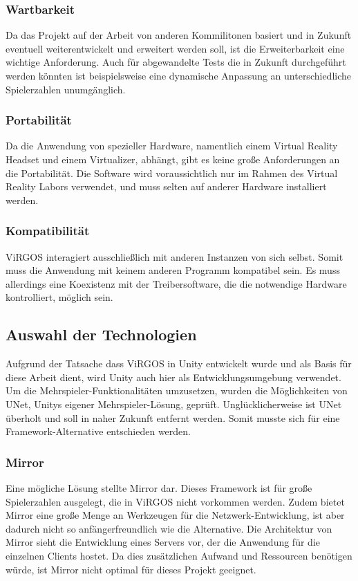 \subsubsection*{Wartbarkeit}
Da das Projekt auf der Arbeit von anderen Kommilitonen basiert und in Zukunft eventuell weiterentwickelt und erweitert werden soll, ist die Erweiterbarkeit eine wichtige Anforderung. Auch für abgewandelte Tests die in Zukunft durchgeführt werden könnten ist beispielsweise eine dynamische Anpassung an unterschiedliche Spielerzahlen unumgänglich.

\subsubsection*{Portabilität}
Da die Anwendung von spezieller Hardware, namentlich einem Virtual Reality Headset und einem Virtualizer, abhängt, gibt es keine große Anforderungen an die Portabilität. Die Software wird voraussichtlich nur im Rahmen des Virtual Reality Labors verwendet, und muss selten auf anderer Hardware installiert werden.

\subsubsection*{Kompatibilität}
ViRGOS interagiert ausschließlich mit anderen Instanzen von sich selbst. Somit muss die Anwendung mit keinem anderen Programm kompatibel sein. Es muss allerdings eine Koexistenz mit der Treibersoftware, die die notwendige Hardware kontrolliert, möglich sein. 


\subsection{Auswahl der Technologien}
Aufgrund der Tatsache dass ViRGOS in Unity entwickelt wurde und als Basis für diese Arbeit dient, wird Unity auch hier als Entwicklungsumgebung verwendet. Um die Mehrspieler-Funktionalitäten umzusetzen, wurden die Möglichkeiten von UNet, Unitys eigener Mehrspieler-Lösung, geprüft. Unglücklicherweise ist UNet überholt und soll in naher Zukunft entfernt werden. Somit musste sich für eine Framework-Alternative entschieden werden.

\subsubsection{Mirror}
Eine mögliche Lösung stellte Mirror dar. Dieses Framework ist für große Spielerzahlen ausgelegt, die in ViRGOS nicht vorkommen werden. Zudem bietet Mirror eine große Menge an Werkzeugen für die Netzwerk-Entwicklung, ist aber dadurch nicht so anfängerfreundlich wie die Alternative. Die Architektur von Mirror sieht die Entwicklung eines Servers vor, der die Anwendung für die einzelnen Clients hostet. Da dies zusätzlichen Aufwand und Ressourcen benötigen würde, ist Mirror nicht optimal für dieses Projekt geeignet. 

